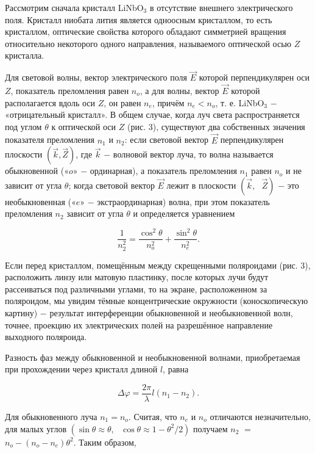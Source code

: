 \documentclass[a4paper,12pt]{article} %
\begin{document}
\hfill \break Рассмотрим сначала кристалл LiNbO$_3$ в отсутствие внешнего электрического поля. Кристалл ниобата лития является одноосным кристаллом, то есть кристаллом, оптические свойства которого обладают симметрией вращения относительно некоторого одного направления, называемого оптической осью $Z$ кристалла. 

\hfill \break Для световой волны, вектор электрического поля $\vec{E}$ которой перпендикулярен оси $Z$, показатель преломления равен $n_o$, а для волны, вектор $\vec{E}$ которой располагается вдоль оси $Z$, он равен $n_e$, причём $n_e < n_o$, т. е. LiNbO$_3$ $-$ «отрицательный кристалл». В общем случае, когда луч света распространяется под углом $\theta$ к оптической оси $Z$ (рис. 3), существуют два собственных значения показателя преломления $n_1$ и $n_2$: если световой вектор $\vec{E}$ перпендикулярен плоскости $(\vec{k},\vec{Z})$, где $\vec{k}$ $-$ волновой вектор луча, то волна называется обыкновенной («$o$» $-$ ординарная), а показатель преломления $n_1$ равен $n_o$ и не зависит от угла $\theta$; когда световой вектор $\vec{E}$ лежит в плоскости $(\vec{k}, \text{ } \vec{Z})$ $-$ это необыкновенная («$e$» $-$ экстраординарная) волна, при этом показатель преломления $n_2$ зависит от угла $\theta$ и определяется уравнением
	
\begin{equation*}
	\frac{1}{n_2^2} = \frac{\cos^2\theta}{n_o^2} + \frac{\sin^2\theta}{n_e^2}.
\end{equation*}
	
\hfill \break Если перед кристаллом, помещённым между скрещенными поляроидами (рис. 3), расположить линзу или матовую пластинку, после которых лучи будут рассеиваться под различными углами, то на экране, расположенном за поляроидом, мы увидим тёмные концентрические окружности (коноскопическую картину) $-$ результат интерференции обыкновенной и необыкновенной волн, точнее, проекцию их электрических полей на разрешённое направление выходного поляроида.

\hfill \break Разность фаз между обыкновенной и необыкновенной волнами, приобретаемая при прохождении через кристалл длиной $l$, равна
	
 \begin{equation}
	\Delta \varphi = \frac{2\pi}{\lambda} l (n_1 - n_2).
\end{equation}

\hfill \break Для обыкновенного луча $n_1 = n_o$. Считая, что $n_e$ и $n_o$ отличаются незначительно, для малых углов $(\sin\theta \approx \theta, \text{ } \cos\theta \approx 1 - \theta^2/2)$ получаем $n_2$ $=$ $n_o - (n_o - n_e)\theta^2$. Таким образом,
	
\end{document}
